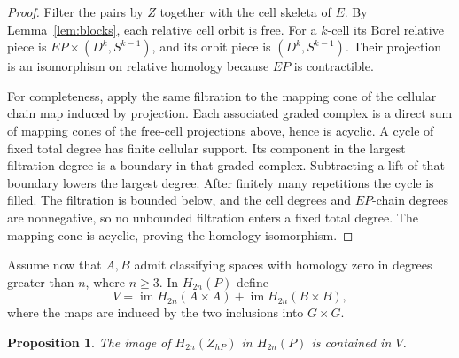 \documentclass[11pt]{article}
\newtheorem{proposition}[theorem]{Proposition}
\theoremstyle{remark}
\newcommand{\im}{\operatorname{im}}
\begin{document}
\begin{proof}
Filter the pairs by \(Z\) together with the cell skeleta of \(E\).
By Lemma~\ref{lem:blocks}, each relative cell orbit is free.
For a \(k\)-cell its Borel relative piece is
\(EP\times(D^k,S^{k-1})\), and its orbit piece is
\((D^k,S^{k-1})\). Their projection is an isomorphism on relative
homology because \(EP\) is contractible.

For completeness, apply the same filtration to the mapping cone
of the cellular chain map induced by projection. Each associated
graded complex is a direct sum of mapping cones of the free-cell
projections above, hence is acyclic. A cycle of fixed total degree
has finite cellular support. Its component in the largest
filtration degree is a boundary in that graded complex.
Subtracting a lift of that boundary lowers the largest degree.
After finitely many repetitions the cycle is filled. The filtration
is bounded below, and the cell degrees and \(EP\)-chain degrees are
nonnegative, so no unbounded filtration enters a fixed total degree.
The mapping cone is acyclic, proving the homology isomorphism.
\end{proof}

Assume now that \(A,B\) admit classifying spaces with homology zero in
degrees greater than \(n\), where \(n\geq3\). In \(H_{2n}(P)\) define
\[
 V=\im H_{2n}(A\times A)+\im H_{2n}(B\times B),
\]
where the maps are induced by the two inclusions into \(G\times G\).

\begin{proposition}\label{prop:image}
The image of \(H_{2n}(Z_{hP})\) in \(H_{2n}(P)\) is contained in \(V\).
\end{proposition}
\end{document}
